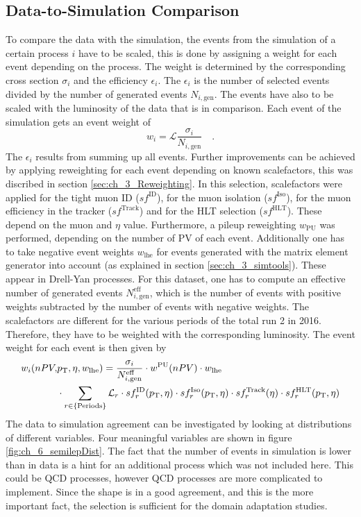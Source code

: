 \subsection{Data-to-Simulation Comparison}
To compare the data with the simulation, the events from the simulation of a certain process $i$ have to be scaled, this is done by assigning a weight for each event depending on the process. The weight is determined by the corresponding cross section $\sigma_i$ and the efficiency $\epsilon_i$. The $\epsilon_i$ is the number of selected events divided by the number of generated events $N_{i,\textrm{gen}}$. The events have also to be scaled with the luminosity of the data that is in comparison. Each event of the simulation gets an event weight of
\begin{equation}
w_i = \mathcal{L} \frac{ \sigma_i}{N_{i,\textrm{gen}}} \quad . 
\end{equation}
The $\epsilon_i$ results from summing up all events. Further improvements can be achieved by applying reweighting for each event depending on known scalefactors, this was discribed in section \ref{sec:ch_3_Reweighting}. In this selection, scalefactors were applied for the tight muon ID ($sf^\textrm{ID}$), for the muon isolation ($sf^\textrm{Iso}$), for the muon efficiency in the tracker ($sf^\textrm{Track}$) and for the HLT selection ($sf^\textrm{HLT}$). These depend on the muon \pt and $\eta$ value. Furthermore, a pileup reweighting $w_\textrm{PU}$ was performed, depending on the number of PV of each event. Additionally one has to take negative event weights $w_\textrm{lhe}$ for events generated with the \amcatnlo matrix element generator into account (as explained in section \ref{sec:ch_3_simtools}). These appear in Drell-Yan processes. For this dataset, one has to compute an effective number of generated events $N_{i,\textrm{gen}}^\textrm{eff}$, which is the number of events with positive weights subtracted by the number of events with negative weights. The scalefactors are different for the various periods of the total run 2 in 2016. Therefore, they have to be weighted with the corresponding luminosity. The event weight for each event is then given by
\begin{equation}
\begin{split}
w_i(nPV,&p_\mathrm{T},\eta, w_\textrm{lhe}) = \frac{\sigma_i}{N_{i,\textrm{gen}}^\textrm{eff}}\cdot w^\textrm{PU}(nPV) \cdot w_\textrm{lhe} \\
 & \cdot \sum_{r \in \{\textrm{Periods}\}} \mathcal{L}_r \cdot sf^\textrm{ID}_r(p_\mathrm{T},\eta) \cdot sf^\textrm{Iso}_r(p_\mathrm{T},\eta) \cdot sf^\textrm{Track}_r(\eta) \cdot sf^\textrm{HLT}_r(p_\mathrm{T},\eta) 
\end{split}
\end{equation}
The data to simulation agreement can be investigated by looking at distributions of different variables. Four meaningful variables are shown in figure \ref{fig:ch_6_semilepDist}. The fact that the number of events in simulation is lower than in data is a hint for an additional process which was not included here. This could be QCD processes, however QCD processes are more complicated to implement. Since the shape is in a good agreement, and this is the more important fact, the selection is sufficient for the domain adaptation studies.


